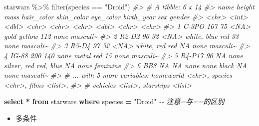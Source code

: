 \documentclass[
]{book}
\newenvironment{Shaded}{\begin{snugshade}}{\end{snugshade}}
\newcommand{\CommentTok}[1]{\textcolor[rgb]{0.56,0.35,0.01}{\textit{#1}}}
\newcommand{\FunctionTok}[1]{\textcolor[rgb]{0.00,0.00,0.00}{#1}}
\newcommand{\KeywordTok}[1]{\textcolor[rgb]{0.13,0.29,0.53}{\textbf{#1}}}
\newcommand{\NormalTok}[1]{#1}
\newcommand{\OperatorTok}[1]{\textcolor[rgb]{0.81,0.36,0.00}{\textbf{#1}}}
\newcommand{\OtherTok}[1]{\textcolor[rgb]{0.56,0.35,0.01}{#1}}
\newcommand{\SpecialCharTok}[1]{\textcolor[rgb]{0.00,0.00,0.00}{#1}}
\newcommand{\StringTok}[1]{\textcolor[rgb]{0.31,0.60,0.02}{#1}}
\providecommand{\tightlist}{%
  \setlength{\itemsep}{0pt}\setlength{\parskip}{0pt}}
\begin{document}
\begin{Shaded}
\begin{Highlighting}[]
\NormalTok{starwars }\SpecialCharTok{\%\textgreater{}\%} 
  \FunctionTok{filter}\NormalTok{(species }\SpecialCharTok{==} \StringTok{"Droid"}\NormalTok{)}
\CommentTok{\#\textgreater{} \# A tibble: 6 x 14}
\CommentTok{\#\textgreater{}   name   height  mass hair\_color skin\_color  eye\_color birth\_year sex   gender  }
\CommentTok{\#\textgreater{}   \textless{}chr\textgreater{}   \textless{}int\textgreater{} \textless{}dbl\textgreater{} \textless{}chr\textgreater{}      \textless{}chr\textgreater{}       \textless{}chr\textgreater{}          \textless{}dbl\textgreater{} \textless{}chr\textgreater{} \textless{}chr\textgreater{}   }
\CommentTok{\#\textgreater{} 1 C{-}3PO     167    75 \textless{}NA\textgreater{}       gold        yellow           112 none  masculi\textasciitilde{}}
\CommentTok{\#\textgreater{} 2 R2{-}D2      96    32 \textless{}NA\textgreater{}       white, blue red               33 none  masculi\textasciitilde{}}
\CommentTok{\#\textgreater{} 3 R5{-}D4      97    32 \textless{}NA\textgreater{}       white, red  red               NA none  masculi\textasciitilde{}}
\CommentTok{\#\textgreater{} 4 IG{-}88     200   140 none       metal       red               15 none  masculi\textasciitilde{}}
\CommentTok{\#\textgreater{} 5 R4{-}P17     96    NA none       silver, red red, blue         NA none  feminine}
\CommentTok{\#\textgreater{} 6 BB8        NA    NA none       none        black             NA none  masculi\textasciitilde{}}
\CommentTok{\#\textgreater{} \# ... with 5 more variables: homeworld \textless{}chr\textgreater{}, species \textless{}chr\textgreater{}, films \textless{}list\textgreater{},}
\CommentTok{\#\textgreater{} \#   vehicles \textless{}list\textgreater{}, starships \textless{}list\textgreater{}}
\end{Highlighting}
\end{Shaded}

\begin{Shaded}
\begin{Highlighting}[]
\KeywordTok{select} \OperatorTok{*} \KeywordTok{from}\NormalTok{ starwars }\KeywordTok{where}\NormalTok{ species }\OperatorTok{=} \OtherTok{"Droid"} \CommentTok{{-}{-} 注意=与==的区别}
\end{Highlighting}
\end{Shaded}

\begin{itemize}
\tightlist
\item
  多条件
\end{itemize}
\end{document}

